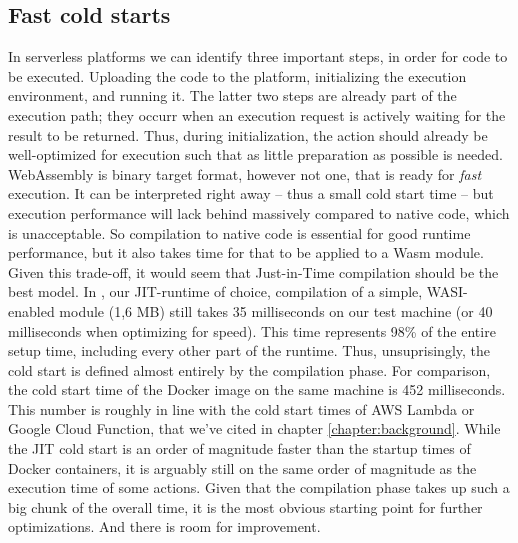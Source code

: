 
\subsection{Fast cold starts}
In serverless platforms we can identify three important steps, in order for code to be executed. Uploading the code to the platform, initializing the execution environment, and running it. The latter two steps are already part of the execution path; they occurr when an execution request is actively waiting for the result to be returned. Thus, during initialization, the action should already be well-optimized for execution such that as little preparation as possible is needed. WebAssembly is binary target format, however not one, that is ready for \emph{fast} execution. It can be interpreted right away -- thus a small cold start time -- but execution performance will lack behind massively compared to native code, which is unacceptable. So compilation to native code is essential for good runtime performance, but it also takes time for that to be applied to a Wasm module. Given this trade-off, it would seem that Just-in-Time compilation should be the best model. In , our JIT-runtime of choice, compilation of a simple, WASI-enabled module (1,6 MB) still takes 35 milliseconds on our test machine (or 40 milliseconds when optimizing for speed). This time represents 98\% of the entire setup time, including every other part of the runtime. Thus, unsuprisingly, the cold start is defined almost entirely by the compilation phase. For comparison, the cold start time of the  Docker image on the same machine is 452 milliseconds. This number is roughly in line with the cold start times of AWS Lambda or Google Cloud Function, that we've cited in chapter \ref{chapter:background}. While the JIT cold start is an order of magnitude faster than the startup times of Docker containers, it is arguably still on the same order of magnitude as the execution time of some actions. Given that the compilation phase takes up such a big chunk of the overall time, it is the most obvious starting point for further optimizations. And there is room for improvement.

